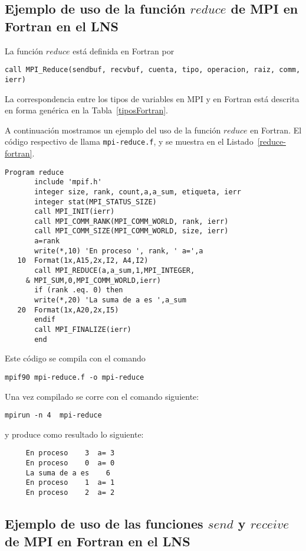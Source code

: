 \documentclass[letter]{jpconf}
\begin{document}
\subsection{Ejemplo de uso de la funci\'on $reduce$ de MPI en Fortran en el LNS}

La funci\'on $reduce$ est\'a definida en Fortran por
\color{black}
\begin{verbatim}
call MPI_Reduce(sendbuf, recvbuf, cuenta, tipo, operacion, raiz, comm, ierr) 
\end{verbatim}
\color{black}
La correspondencia entre los tipos de variables en MPI y en Fortran est\'a descrita en forma gen\'erica en la Tabla~\ref{tiposFortran}.

A continuaci\'on mostramos un ejemplo del uso de la funci\'on $reduce$ en Fortran. El c\'odigo respectivo de llama  \texttt{mpi-reduce.f},  y se muestra en el Listado~\ref{reduce-fortran}.
\begin{lstlisting}[float,floatplacement=H,label=reduce-fortran,caption=Listado del programa  \texttt{mpi-reduce.f} en Fortran]
       Program reduce
       include 'mpif.h'
       integer size, rank, count,a,a_sum, etiqueta, ierr
       integer stat(MPI_STATUS_SIZE)   
       call MPI_INIT(ierr)
       call MPI_COMM_RANK(MPI_COMM_WORLD, rank, ierr)
       call MPI_COMM_SIZE(MPI_COMM_WORLD, size, ierr)
       a=rank
       write(*,10) 'En proceso ', rank, ' a=',a
   10  Format(1x,A15,2x,I2, A4,I2)
       call MPI_REDUCE(a,a_sum,1,MPI_INTEGER,
     & MPI_SUM,0,MPI_COMM_WORLD,ierr)
       if (rank .eq. 0) then
       write(*,20) 'La suma de a es ',a_sum
   20  Format(1x,A20,2x,I5)
       endif
       call MPI_FINALIZE(ierr)
       end
 \end{lstlisting}


Este c\'odigo se compila con el comando
\color{blue}
\begin{verbatim}
mpif90 mpi-reduce.f -o mpi-reduce
\end{verbatim}
\color{black}
Una vez compilado se corre con el comando siguiente:
\color{blue}
\begin{verbatim}
mpirun -n 4  mpi-reduce
\end{verbatim}
\color{black}
y produce como resultado lo siguiente:
\color{brown}
\begin{verbatim}
     En proceso    3  a= 3
     En proceso    0  a= 0
     La suma de a es    6
     En proceso    1  a= 1
     En proceso    2  a= 2
 \end{verbatim}
\color{black}


\subsection{Ejemplo de uso de las funciones $send$ y $receive$ de MPI en Fortran en el LNS}
\end{document}
